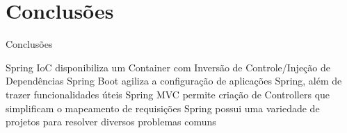 \documentclass{beamer}
\begin{document}
\section{Conclusões}

\begin{frame}{Conclusões}
 \begin{outline}
   \alert{Spring IoC} disponibiliza um Container com Inversão de Controle/Injeção de Dependências
   \alert{Spring Boot} agiliza a configuração de aplicações Spring, além de trazer funcionalidades úteis
   \alert{Spring MVC} permite criação de Controllers que simplificam o mapeamento de requisições
   Spring possui uma variedade de projetos para resolver diversos problemas comuns
 \end{outline}

\end{frame}
\end{document}
